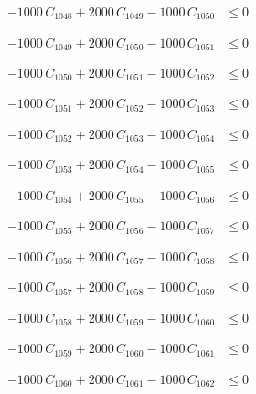 \documentclass[a4paper,11pt]{article}
\begin{document}
\begin{align}
-1000\,C_{1048} + 2000\,C_{1049} - 1000\,C_{1050} &\leq 0 \nonumber
\end{align}

\begin{align}
-1000\,C_{1049} + 2000\,C_{1050} - 1000\,C_{1051} &\leq 0 \nonumber
\end{align}

\begin{align}
-1000\,C_{1050} + 2000\,C_{1051} - 1000\,C_{1052} &\leq 0 \nonumber
\end{align}

\begin{align}
-1000\,C_{1051} + 2000\,C_{1052} - 1000\,C_{1053} &\leq 0 \nonumber
\end{align}

\begin{align}
-1000\,C_{1052} + 2000\,C_{1053} - 1000\,C_{1054} &\leq 0 \nonumber
\end{align}

\begin{align}
-1000\,C_{1053} + 2000\,C_{1054} - 1000\,C_{1055} &\leq 0 \nonumber
\end{align}

\begin{align}
-1000\,C_{1054} + 2000\,C_{1055} - 1000\,C_{1056} &\leq 0 \nonumber
\end{align}

\begin{align}
-1000\,C_{1055} + 2000\,C_{1056} - 1000\,C_{1057} &\leq 0 \nonumber
\end{align}

\begin{align}
-1000\,C_{1056} + 2000\,C_{1057} - 1000\,C_{1058} &\leq 0 \nonumber
\end{align}

\begin{align}
-1000\,C_{1057} + 2000\,C_{1058} - 1000\,C_{1059} &\leq 0 \nonumber
\end{align}

\begin{align}
-1000\,C_{1058} + 2000\,C_{1059} - 1000\,C_{1060} &\leq 0 \nonumber
\end{align}

\begin{align}
-1000\,C_{1059} + 2000\,C_{1060} - 1000\,C_{1061} &\leq 0 \nonumber
\end{align}

\begin{align}
-1000\,C_{1060} + 2000\,C_{1061} - 1000\,C_{1062} &\leq 0 \nonumber
\end{align}
\end{document}
